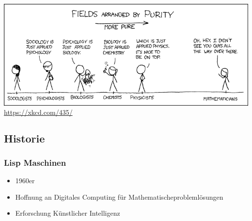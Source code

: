\documentclass{beamer}
\begin{document}
\begin{frame}
	\centering
	\includegraphics[scale=0.35]{bilder/purity.png}
    \textmd{\url{https://xkcd.com/435/}}
\end{frame}

\begin{frame}
	\section{Historie}
\frametitle{Lisp Maschinen}
	\begin{itemize}
            \item 1960er
            \item Hoffnung an Digitales Computing für Mathematischeproblemlösungen 
            \item Erforschung Künstlicher Intelligenz
	\end{itemize}
	  

\end{frame}
\end{document}
